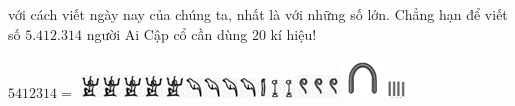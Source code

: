 \begin{multicols}{2}
với cách viết ngày nay của chúng ta, nhất là với những số lớn. Chẳng hạn để viết số ${5.}412{.}314$ người Ai Cập cổ cần dùng $20$ kí hiệu!
	\begin{center}
		$5412314   =$ \includegraphics[scale=0.85]{7}\includegraphics[scale=0.85]{7}\includegraphics[scale=0.85]{7}\includegraphics[scale=0.85]{7}\includegraphics[scale=0.85]{7}\includegraphics[scale=0.85]{8}\includegraphics[scale=0.85]{8}\includegraphics[scale=0.85]{8}\includegraphics[scale=0.85]{8}\includegraphics[scale=0.85]{9}\includegraphics[scale=0.85]{10}\includegraphics[scale=0.85]{10}\includegraphics[scale=0.85]{11}\includegraphics[scale=0.85]{11}\includegraphics[scale=0.85]{11}\includegraphics[scale=0.85]{5}\includegraphics[scale=0.85]{3}

\end{center}
\end{multicols}
